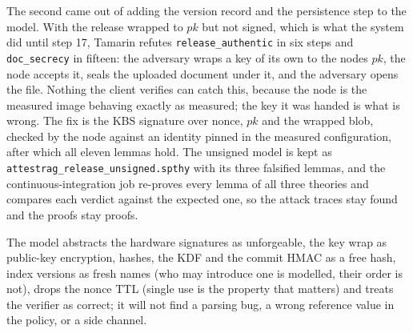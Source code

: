 \documentclass[letterpaper,twocolumn,10pt]{article}
\begin{document}
The second came out of adding the version record and the persistence step to the model. With the release wrapped to \(pk\) but not signed, which is what the system did until step 17, Tamarin refutes \texttt{release\_authentic} in six steps and \texttt{doc\_secrecy} in fifteen: the adversary wraps a key of its own to the node\textquotesingle s \(pk\), the node accepts it, seals the uploaded document under it, and the adversary opens the file. Nothing the client verifies can catch this, because the node is the measured image behaving exactly as measured; the key it was handed is what is wrong. The fix is the KBS signature over nonce, \(pk\) and the wrapped blob, checked by the node against an identity pinned in the measured configuration, after which all eleven lemmas hold. The unsigned model is kept as \texttt{attestrag\_release\_unsigned.spthy} with its three falsified lemmas, and the continuous-integration job re-proves every lemma of all three theories and compares each verdict against the expected one, so the attack traces stay found and the proofs stay proofs.

The model abstracts the hardware signatures as unforgeable, the key wrap as public-key encryption, hashes, the KDF and the commit HMAC as a free hash, index versions as fresh names (who may introduce one is modelled, their order is not), drops the nonce TTL (single use is the property that matters) and treats the verifier as correct; it will not find a parsing bug, a wrong reference value in the policy, or a side channel.
\end{document}
